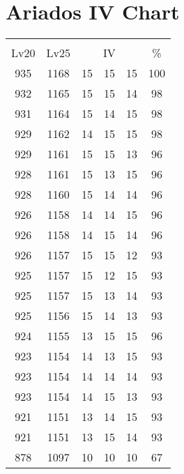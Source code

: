 \documentclass{article}%
\begin{document}
%
\normalsize%
\section{Ariados IV Chart}%
\label{sec:Ariados IV Chart}%
\renewcommand{\arraystretch}{1.5}%
\begin{tabular}{|c|c|c|c|c|c|}%
\hline%
\multicolumn{6}{|c|}{\textcolor{white}{ 
\linebreak{Ariados}
}%
\cellcolor{black}}\\%
\multicolumn{1}{|c}{Lv20}&\multicolumn{1}{c|}{Lv25}&\multicolumn{3}{c|}{IV}&\multicolumn{1}{|c|}{\%}\\%
\hline%
\rowcolor{color100}%
935&1168&15&15&15&100\\%
\hline%
\rowcolor{color98}%
932&1165&15&15&14&98\\%
\hline%
\rowcolor{color98}%
931&1164&15&14&15&98\\%
\hline%
\rowcolor{color98}%
929&1162&14&15&15&98\\%
\hline%
\rowcolor{color96}%
929&1161&15&15&13&96\\%
\hline%
\rowcolor{color96}%
928&1161&15&13&15&96\\%
\hline%
\rowcolor{color96}%
928&1160&15&14&14&96\\%
\hline%
\rowcolor{color96}%
926&1158&14&14&15&96\\%
\hline%
\rowcolor{color96}%
926&1158&14&15&14&96\\%
\hline%
\rowcolor{color93}%
926&1157&15&15&12&93\\%
\hline%
\rowcolor{color93}%
925&1157&15&12&15&93\\%
\hline%
\rowcolor{color93}%
925&1157&15&13&14&93\\%
\hline%
\rowcolor{color93}%
925&1156&15&14&13&93\\%
\hline%
\rowcolor{color96}%
924&1155&13&15&15&96\\%
\hline%
\rowcolor{color93}%
923&1154&14&13&15&93\\%
\hline%
\rowcolor{color93}%
923&1154&14&14&14&93\\%
\hline%
\rowcolor{color93}%
923&1154&14&15&13&93\\%
\hline%
\rowcolor{color93}%
921&1151&13&14&15&93\\%
\hline%
\rowcolor{color93}%
921&1151&13&15&14&93\\%
\hline%
\rowcolor{color91}%
878&1097&10&10&10&67\\%
\end{tabular}

%
\end{document}
